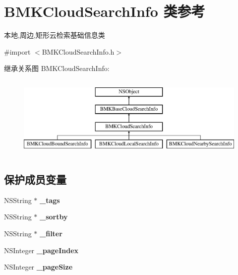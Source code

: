 \hypertarget{interface_b_m_k_cloud_search_info}{\section{B\-M\-K\-Cloud\-Search\-Info 类参考}
\label{interface_b_m_k_cloud_search_info}
}


本地,周边,矩形云检索基础信息类  




{\ttfamily \#import $<$B\-M\-K\-Cloud\-Search\-Info.\-h$>$}

继承关系图 B\-M\-K\-Cloud\-Search\-Info\-:\begin{figure}[H]
\begin{center}
\leavevmode
\includegraphics[height=4.000000cm]{interface_b_m_k_cloud_search_info}
\end{center}
\end{figure}
\subsection*{保护成员变量}
\begin{DoxyCompactItemize}
\item 
\hypertarget{interface_b_m_k_cloud_search_info_a40b12c1fbccf0956451838cd83f82be0}{N\-S\-String $\ast$ {\bfseries \-\_\-tags}}\label{interface_b_m_k_cloud_search_info_a40b12c1fbccf0956451838cd83f82be0}

\item 
\hypertarget{interface_b_m_k_cloud_search_info_a263c562ad6526d87421ec56a7ea55ea0}{N\-S\-String $\ast$ {\bfseries \-\_\-sortby}}\label{interface_b_m_k_cloud_search_info_a263c562ad6526d87421ec56a7ea55ea0}

\item 
\hypertarget{interface_b_m_k_cloud_search_info_a03b41d160bf2aaec634b34296dc5f0c5}{N\-S\-String $\ast$ {\bfseries \-\_\-filter}}\label{interface_b_m_k_cloud_search_info_a03b41d160bf2aaec634b34296dc5f0c5}

\item 
\hypertarget{interface_b_m_k_cloud_search_info_ac0e87c49e04dc123eb147ff4bf1e8cb6}{N\-S\-Integer {\bfseries \-\_\-page\-Index}}\label{interface_b_m_k_cloud_search_info_ac0e87c49e04dc123eb147ff4bf1e8cb6}

\item 
\hypertarget{interface_b_m_k_cloud_search_info_aca814c9ad2df72058f20575244e64ec3}{N\-S\-Integer {\bfseries \-\_\-page\-Size}}\label{interface_b_m_k_cloud_search_info_aca814c9ad2df72058f20575244e64ec3}

\end{DoxyCompactItemize}
